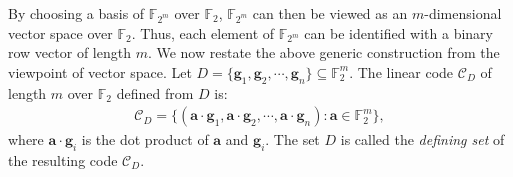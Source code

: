 \documentclass[10pt]{article}
\newcommand{\F}{\mathbb{F}}
\newcommand{\0}{\textbf{0}}
\newcommand{\1}{\textbf{1}}
\begin{document}
\iffalse
Since the vector space $\F_2^m$ is isomorphic to the finite field $\F_{2^m}$ through the choice of some basis
of $\F_{2^m}$ over $\F_2$. If $(\lambda_1, \lambda_2,\cdots,\lambda_m)$ is a basis of $\F_{2^m}$ over $\F_2$,
then every vector $x=(x_1,\cdots,x_m)$ of $\F_2^m$ can be identified with the element
$x_1\lambda_1+x_2\lambda_2+\cdots+x_m\lambda_m\in\F_{2^m}$.
The finite field $\F_{2^m}$ can then be viewed as an $m$-dimensional vector space over $\F_2$.
Further, each of its elements can be identified with a binary vector of
length $m$.\fi

 By choosing a basis of $\F_{2^m}$ over $\F_2$, $\F_{2^m}$ can then be viewed as an $m$-dimensional vector space over $\F_2$.
 Thus, each element of  $\F_{2^m}$ can be identified with a binary row vector of length $m$. We now restate the above generic construction from the viewpoint of vector space. Let $D=\{\mathbf g_1,\mathbf g_2, \cdots, \mathbf g_{n}\}\subseteq \mathbb F_2^m$.
The linear  code $\mathcal C_{D}$  of length $m$ over $\mathbb F_2$  defined from $D$ is:
\begin{align}\label{eq:C-D}
\mathcal C_{D}=\{(\mathbf a\cdot \mathbf g_1, \mathbf a\cdot \mathbf g_2, \cdots, \mathbf a\cdot \mathbf g_{n}): \mathbf a \in \mathbb F_2^m\},
\end{align}
where $\mathbf a\cdot \mathbf g_i$  is the dot product of $\mathbf a$ and $ \mathbf g_i$.
The set $D$ is called the \emph{defining set} of the resulting code $\mathcal C_D$.
\end{document}
